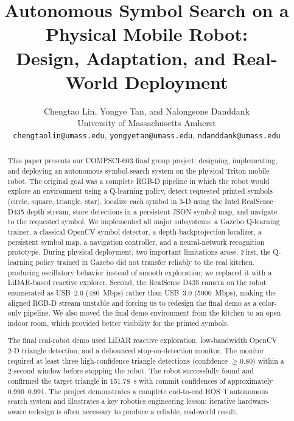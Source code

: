 \documentclass[letterpaper, 10 pt, conference]{ieeeconf/ieeeconf}
\begin{document}
\title{\LARGE \bf
Autonomous Symbol Search on a Physical Mobile Robot:\\
Design, Adaptation, and Real-World Deployment
}

\author{Chengtao Lin, Yongye Tan, and Nalongsone Danddank\\
University of Massachusetts Amherst\\
\texttt{chengtaolin@umass.edu},
\texttt{yongyetan@umass.edu},
\texttt{ndanddank@umass.edu}}

\maketitle
\thispagestyle{empty}
\pagestyle{empty}

\begin{abstract}
This paper presents our COMPSCI-603 final group project: designing, implementing,
and deploying an autonomous symbol-search system on the physical Triton mobile
robot.
The original goal was a complete RGB-D pipeline in which the robot would explore
an environment using a Q-learning policy, detect requested printed symbols
(circle, square, triangle, star), localize each symbol in 3-D using the Intel
RealSense D435 depth stream, store detections in a persistent JSON symbol map,
and navigate to the requested symbol.
We implemented all major subsystems: a Gazebo Q-learning trainer, a classical
OpenCV symbol detector, a depth-backprojection localizer, a persistent symbol
map, a navigation controller, and a neural-network recognition prototype.
During physical deployment, two important limitations arose.
First, the Q-learning policy trained in Gazebo did not transfer reliably to
the real kitchen, producing oscillatory behavior instead of smooth exploration;
we replaced it with a LiDAR-based reactive explorer.
Second, the RealSense D435 camera on the robot enumerated as USB~2.0 (480~Mbps)
rather than USB~3.0 (5000~Mbps), making the aligned RGB-D stream unstable and
forcing us to redesign the final demo as a color-only pipeline.
We also moved the final demo environment from the kitchen to an open indoor
room, which provided better visibility for the printed symbols.

The final real-robot demo used LiDAR reactive exploration, low-bandwidth
OpenCV 2-D triangle detection, and a debounced stop-on-detection monitor.
The monitor required at least three high-confidence triangle detections
(confidence $\geq 0.80$) within a 2-second window before stopping the robot.
The robot successfully found and confirmed the target triangle in 151.78~s
with commit confidences of approximately 0.990--0.991.
The project demonstrates a complete end-to-end ROS~1 autonomous search
system and illustrates a key robotics engineering lesson: iterative
hardware-aware redesign is often necessary to produce a reliable, real-world result.
\end{abstract}
\end{document}
